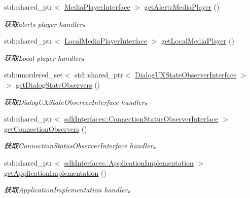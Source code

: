 \begin{DoxyCompactItemize}
std\+::shared\+\_\+ptr$<$ \hyperlink{classduerOSDcsSDK_1_1sdkInterfaces_1_1MediaPlayerInterface}{Media\+Player\+Interface} $>$ \hyperlink{structduerOSDcsSDK_1_1sdkInterfaces_1_1DcsSdkParameters_aedb56e9d51342ce49920decb10c4aae3}{get\+Alerts\+Media\+Player} ()
\begin{DoxyCompactList}\small\item\em 获取alerts player handler。 \end{DoxyCompactList}\item 
std\+::shared\+\_\+ptr$<$ \hyperlink{classduerOSDcsSDK_1_1sdkInterfaces_1_1LocalMediaPlayerInterface}{Local\+Media\+Player\+Interface} $>$ \hyperlink{structduerOSDcsSDK_1_1sdkInterfaces_1_1DcsSdkParameters_a20b4b22628b1708787e12f3623082f7b}{get\+Local\+Media\+Player} ()
\begin{DoxyCompactList}\small\item\em 获取\+Local player handler。 \end{DoxyCompactList}\item 
std\+::unordered\+\_\+set$<$ std\+::shared\+\_\+ptr$<$ \hyperlink{classduerOSDcsSDK_1_1sdkInterfaces_1_1DialogUXStateObserverInterface}{Dialog\+U\+X\+State\+Observer\+Interface} $>$ $>$ \hyperlink{structduerOSDcsSDK_1_1sdkInterfaces_1_1DcsSdkParameters_a77f1bc5116b53c12cb1d115e35ff7b14}{get\+Dialog\+State\+Observers} ()
\begin{DoxyCompactList}\small\item\em 获取\+Dialog\+U\+X\+State\+Observer\+Interface handler。 \end{DoxyCompactList}\item 
std\+::shared\+\_\+ptr$<$ \hyperlink{classduerOSDcsSDK_1_1sdkInterfaces_1_1ConnectionStatusObserverInterface}{sdk\+Interfaces\+::\+Connection\+Status\+Observer\+Interface} $>$ \hyperlink{structduerOSDcsSDK_1_1sdkInterfaces_1_1DcsSdkParameters_adfd39ff4af037a2844d1e977eb00b8c5}{get\+Connection\+Observers} ()
\begin{DoxyCompactList}\small\item\em 获取\+Connection\+Status\+Observer\+Interface handler。 \end{DoxyCompactList}\item 
std\+::shared\+\_\+ptr$<$ \hyperlink{classduerOSDcsSDK_1_1sdkInterfaces_1_1ApplicationImplementation}{sdk\+Interfaces\+::\+Application\+Implementation} $>$ \hyperlink{structduerOSDcsSDK_1_1sdkInterfaces_1_1DcsSdkParameters_ac6c35ff867585dbfce21418ee200bcb2}{get\+Application\+Implementation} ()
\begin{DoxyCompactList}\small\item\em 获取\+Application\+Implementation handler。 \end{DoxyCompactList}\item 

\end{DoxyCompactItemize}

